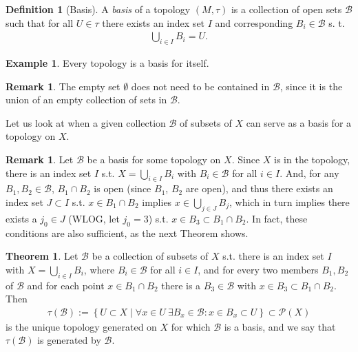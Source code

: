 \documentclass[12pt, a4paper]{article}
\numberwithin{equation}{section}
\theoremstyle{definition}
\theoremstyle{definition}
\newtheorem{defn}[thm]{Definition} %
\newtheorem{exmp}[thm]{Example} %
\newtheorem{remark}[thm]{Remark} %
\newtheorem{theorem}[thm]{Theorem}
\begin{document}
		\begin{defn}[Basis]
			A \textit{basis} of a topology $\left(M, \tau\right)$ is a collection of open sets $\mathcal B$ such that for all $U\in \tau$ there exists an index set $I$ and corresponding $B_i\in \mathcal B$ s. t. 
			\begin{align}
				\bigcup_{i\in I}B_i = U. 
			\end{align}
		\end{defn}
	
		\begin{exmp}
			Every topology is a basis for itself.
		\end{exmp}
	
		\begin{remark}
			The empty set $\emptyset$ does not need to be contained in $\mathscr B$, since it is the union of an empty collection of sets in $\mathscr B$.
		\end{remark}
	
		Let us look at when a given collection $\mathscr B$ of subsets of $X$ can serve as a basis for a topology on $X$.
		
		\begin{remark}
			Let $\mathscr B$ be a basis for some topology on $X$. Since $X$ is in the topology, there is an index set $I$ s.t. $X = \bigcup_{i\in I}B_i$ with $B_i\in\mathscr B$ for all $i\in I$. And, for any $B_1, B_2\in\mathscr B$, $B_1\cap B_2$ is open (since $B_1$, $B_2$ are open), and thus there exists an index set $J\subset I$ s.t. $x\in B_1\cap B_2$ implies $x\in \bigcup_{j\in J}B_j$, which in turn implies there exists a $j_0 \in J$ (WLOG, let $j_0 = 3$) s.t. $x\in B_3\subset B_1\cap B_2$. In fact, these conditions are also sufficient, as the next Theorem shows.
		\end{remark}
	
		\begin{theorem}\label{thrm:gen_top_by_coll_subsets}
			Let $\mathscr B$ be a collection of subsets of $X$ s.t. there is an index set $I$ with $X = \bigcup_{i\in I}B_i$, where $B_i\in\mathscr B$ for all $i\in I$, and for every two members $B_1, B_2$ of $\mathscr B$ and for each point $x\in B_1\cap B_2$ there is a $B_3\in\mathscr B$ with $x\in B_3\subset B_1\cap B_2$. Then 
			\begin{align}\label{eq:gen_top_by_coll_subsets}
				\tau(\mathscr B) := \left\{ U\subset X \mid \forall x\in U\ \exists B_x\in\mathscr B: x\in B_x\subset U\right\}\subset \mathscr P(X)
			\end{align} is the unique topology generated on $X$ for which $\mathscr B$ is a basis, and we say that $\tau(\mathscr B)$ is generated by $\mathscr B$.
		\end{theorem}	
		
\end{document}
